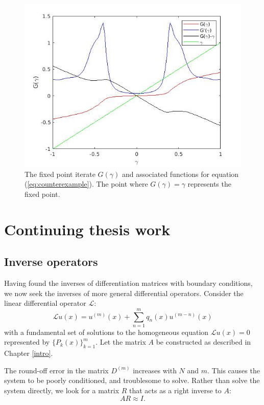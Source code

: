 \documentclass{book}
\begin{document}
\begin{figure}
\centering
\includegraphics[width=\textwidth]{exp8_01.jpg}
\caption{The fixed point iterate $G(\gamma)$ and associated functions for equation (\ref{eq:counterexample}).
The point where $G(\gamma) = \gamma$ represents the fixed point.}
\label{fig:exp8}
\end{figure}

\chapter{Continuing thesis work}

\section{Inverse operators}

Having found the inverses of differentiation matrices with boundary conditions, we now seek the inverses of more general differential operators.
Consider the linear differential operator $\mathcal{L}$:
\begin{equation}
\mathcal{L} u(x) = u^{(m)}(x) + \sum_{n = 1}^m q_n(x) u^{(m-n)}(x)
\end{equation}
with a fundamental set of solutions to the homogeneous equation $\mathcal{L} u(x) = 0$ represented by $\{ P_k(x) \}_{k=1}^m$.
Let the matrix $A$ be constructed as described in Chapter \ref{intro}.

The round-off error in the matrix $D^{(m)}$ increases with $N$ and $m$.
This causes the system to be poorly conditioned, and troublesome to solve.
Rather than solve the system directly, we look for a matrix $R$ that acts as a right inverse to $A$:
\begin{equation}
A R \approx I.
\end{equation}
\end{document}

